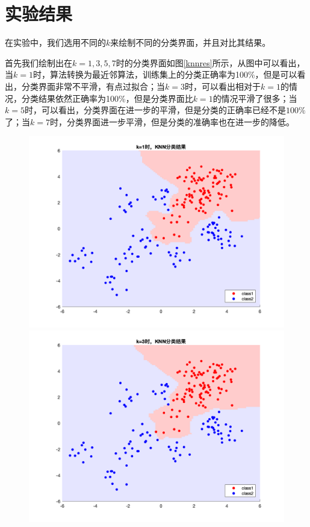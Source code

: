 \documentclass[cn]{elegantbook}
\begin{document}
\section{实验结果}
在实验中，我们选用不同的$k$来绘制不同的分类界面，并且对比其结果。

首先我们绘制出在$k=1,3,5,7$时的分类界面如图\ref{knnres}所示，从图中可以看出，当$k=1$时，算法转换为最近邻算法，训练集上的分类正确率为100\%，但是可以看出，分类界面非常不平滑，有点过拟合；当$k=3$时，可以看出相对于$k=1$的情况，分类结果依然正确率为100\%，但是分类界面比$k=1$的情况平滑了很多；当$k=5$时，可以看出，分类界面在进一步的平滑，但是分类的正确率已经不是$100\%$了；当$k=7$时，分类界面进一步平滑，但是分类的准确率也在进一步的降低。
\begin{figure}[!h]
	\centering
	\begin{minipage}[h]{0.48\linewidth}
		\centering
		\includegraphics[width=\textwidth]{images/knnres1}
	\end{minipage}
\begin{minipage}[h]{0.48\linewidth}
	\centering
	\includegraphics[width=\textwidth]{images/knnres2}

\end{minipage}
\end{figure}
\end{document}
